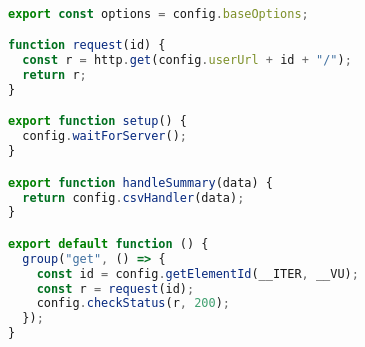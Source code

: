 \begin{lstlisting}[language=JavaScript,caption={K6 Get test},breaklines=true,label={lst:k6Get}]

export const options = config.baseOptions;

function request(id) {
  const r = http.get(config.userUrl + id + "/");
  return r;
}

export function setup() {
  config.waitForServer();
}

export function handleSummary(data) {
  return config.csvHandler(data);
}

export default function () {
  group("get", () => {
    const id = config.getElementId(__ITER, __VU);
    const r = request(id);
    config.checkStatus(r, 200);
  });
}

\end{lstlisting}
